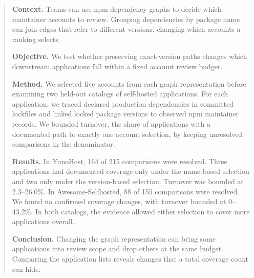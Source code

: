 \begin{abstract}
\textbf{Context.} Teams can use npm dependency graphs to decide which maintainer accounts to review. Grouping dependencies by package name can join edges that refer to different versions, changing which accounts a ranking selects.

\textbf{Objective.} We test whether preserving exact-version paths changes which downstream applications fall within a fixed account review budget.

\textbf{Method.} We selected five accounts from each graph representation before examining two held-out catalogs of self-hosted applications. For each application, we traced declared production dependencies in committed lockfiles and linked locked package versions to observed npm maintainer records. We bounded turnover, the share of applications with a documented path to exactly one account selection, by keeping unresolved comparisons in the denominator.

\textbf{Results.} In YunoHost, 164 of 215 comparisons were resolved. Three applications had documented coverage only under the name-based selection and two only under the version-based selection. Turnover was bounded at 2.3--26.0\%. In Awesome-Selfhosted, 88 of 155 comparisons were resolved. We found no confirmed coverage changes, with turnover bounded at 0--43.2\%. In both catalogs, the evidence allowed either selection to cover more applications overall.

\textbf{Conclusion.} Changing the graph representation can bring some applications into review scope and drop others at the same budget. Comparing the application lists reveals changes that a total coverage count can hide.
\end{abstract}
